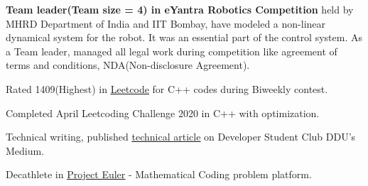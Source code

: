 \begin{cventries}
  \cventry
     {} %
     {} %
     {} %
     {} %
    {
    \begin{cvitems} %
         \item {\textbf{Team leader(Team size = 4) in eYantra Robotics Competition} held by MHRD Department of India and IIT Bombay, have modeled a non-linear dynamical system for the robot. It was an essential  part of the control system. As a Team leader, managed all legal work during competition like agreement of terms and conditions, NDA(Non-disclosure Agreement).}
         \vspace{1.5mm}
         \item{Rated 1409(Highest) in \underline{\href{https://leetcode.com/bagadahardik2000/}{Leetcode}} for C++ codes during Biweekly contest.}
         \vspace{1.5mm}
         \item{Completed April Leetcoding Challenge 2020 in C++ with optimization.}
         \vspace{1.5mm}
         \item{Technical writing, published  \underline{\href{https://medium.com/dscddu/world-of-gis-and-its-applications-65e64ecd2396}{technical article}} on Developer Student Club DDU's Medium.}
         \vspace{1.5mm}
         \item{Decathlete  in \underline{\href{https://projecteuler.net/}{Project Euler}} - Mathematical Coding problem platform.}
    \end{cvitems}
  }
\end{cventries}